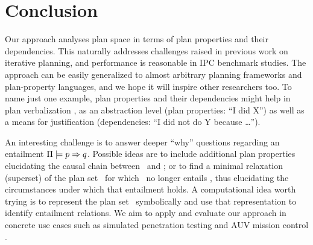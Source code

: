 \section{Conclusion}
\label{conclusion}



Our approach analyses plan space in terms of plan properties and their
dependencies. This naturally addresses challenges raised in previous
work on iterative planning, and performance is reasonable in IPC
benchmark studies. The approach can be easily generalized to almost
arbitrary planning frameworks and plan-property languages, and we hope
it will inspire other researchers too. To name just one example, plan
properties and their dependencies might help in plan verbalization
\cite{rosenthal:etal:ijcai-16}, as an abstraction level (plan
properties: ``I did X'') as well as a means for justification
(dependencies: ``I did not do Y because \dots'').

An interesting challenge is to answer deeper ``why'' questions
regarding an entailment $\Pi \models p \Rightarrow q$. Possible
ideas are to include additional plan properties elucidating the causal
chain between \prop\ and \propq; or to find a minimal relaxation
(superset) of the plan set \plans\ for which \prop\ no longer entails
\propq, thus elucidating the circumstances under which that entailment
holds. A computational idea worth trying is to represent the plan set
\plans\ symbolically and use that representation to identify
entailment relations. We aim to apply and evaluate our approach in
concrete use cases such as simulated penetration testing and AUV
mission control \cite{cashmore:etal:icra-14}.
%
%

%


